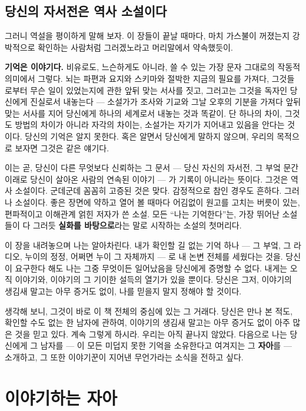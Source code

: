 \section*{당신의 자서전은 역사 소설이다}

그러니 역설을 평이하게 말해 보자. 이 장들이 끝날 때마다, 마치 가스불이 꺼졌는지 강박적으로 확인하는 사람처럼 그러겠노라고 머리말에서 약속했듯이.

\textbf{기억은 이야기다.} 비유로도, 느슨하게도 아니라, 쓸 수 있는 가장 문자 그대로의 작동적 의미에서 그렇다. 뇌는 파편과 요지와 스키마와 절박한 지금의 필요를 가져다, 그것들로부터 무슨 일이 있었는지에 관한 앞뒤 맞는 서사를 짓고, 그러고는 그것을 독자인 당신에게 진실로서 내놓는다 — 소설가가 조사와 기교와 그날 오후의 기분을 가져다 앞뒤 맞는 서사를 지어 당신에게 하나의 세계로서 내놓는 것과 똑같이. 단 하나의 차이, 그것도 방법의 차이가 아니라 자각의 차이는, 소설가는 자기가 지어내고 있음을 안다는 것이다. 당신의 기억은 알지 못한다. 혹은 알면서 당신에게 말하지 않으며, 우리의 목적으로 보자면 그것은 같은 얘기다.

이는 곧, 당신이 다른 무엇보다 신뢰하는 그 문서 — 당신 자신의 자서전, 그 부엌 문간 이래로 당신이 살아온 사람의 연속된 이야기 — 가 기록이 아니라는 뜻이다. 그것은 역사 소설이다. 군데군데 꼼꼼히 고증된 것은 맞다. 감정적으로 참인 경우도 흔하다. 그러나 소설이다. 좋은 장면에 약하고 열어 볼 때마다 어김없이 원고를 고치는 버릇이 있는, 편파적이고 이해관계 얽힌 저자가 쓴 소설. 모든 ``나는 기억한다''는, 가장 뛰어난 소설들이 다 그러듯 \textbf{실화를 바탕으로}라는 말로 시작하는 소설의 첫머리다.

이 장을 내려놓으며 나는 알아차린다. 내가 확인할 길 없는 기억 하나 — 그 부엌, 그 라디오, 누이의 정정, 어쩌면 누이 그 자체까지 — 로 내 논변 전체를 세웠다는 것을. 당신이 요구한다 해도 나는 그중 무엇이든 일어났음을 당신에게 증명할 수 없다. 내게는 오직 이야기와, 이야기의 그 기이한 설득의 열기가 있을 뿐이다. 당신은 그저, 이야기의 생김새 말고는 아무 증거도 없이, 나를 믿을지 말지 정해야 할 것이다.

생각해 보니, 그것이 바로 이 책 전체의 중심에 있는 그 거래다. 당신은 만나 본 적도, 확인할 수도 없는 한 남자에 관하여, 이야기의 생김새 말고는 아무 증거도 없이 아주 많은 것을 믿고 있다. 계속 그렇게 하시라. 우리는 아직 끝나지 않았다. 다음으로 나는 당신에게 그 남자를 — 이 모든 미덥지 못한 기억을 소유한다고 여겨지는 그 \textbf{자아}를 — 소개하고, 그 또한 이야기꾼이 지어낸 무언가라는 소식을 전하고 싶다.

\chapter{이야기하는 자아}

